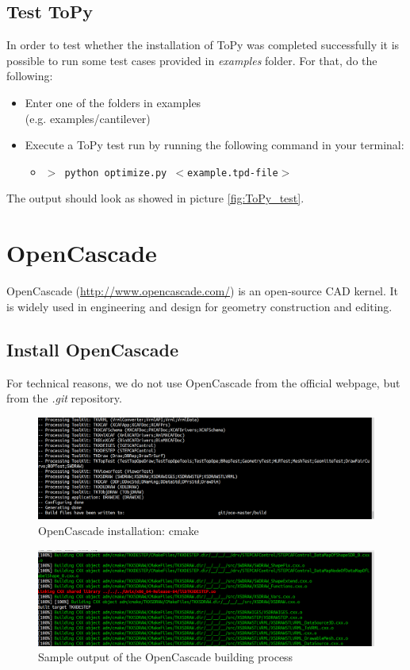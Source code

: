 \documentclass[
12pt, %
a4paper, %
oneside, %
headinclude,footinclude, %
BCOR5mm, %
]{scrartcl}
\begin{document}
\subsection{Test ToPy}
	In order to test whether the installation of ToPy was completed successfully it is possible to run some test cases provided in \textit{examples} folder. For that, do the following:
\begin{itemize}
	\item Enter one of the folders in examples \\(e.g. examples/cantilever)
	\item Execute a ToPy test run by running the following command in your terminal:
\begin{itemize}
	\item[] \texttt{\textbf{$>$ }python optimize.py $<$example.tpd-file$>$}
\end{itemize}
\end{itemize}
%
The output should look as showed in picture \ref{fig:ToPy_test}.

\section{OpenCascade}
\label{OpenCascade}
OpenCascade (\href{http://www.opencascade.com/}{http://www.opencascade.com/}) is an open-source CAD kernel. It is widely used in engineering and design for geometry construction and editing.
\subsection{Install OpenCascade}
For technical reasons, we do not use OpenCascade from the official webpage, but from the \textit{.git} repository. 
\begin{figure}
\centering
\includegraphics[scale=0.3]{img/OC_CMake2_cropped.png}
\caption{OpenCascade installation: cmake}
\label{fig:OC_cmake}
\end{figure}

\begin{figure}
\centering
\includegraphics[scale=0.3]{img/OC_Build5_cut.png}
\caption{Sample output of the OpenCascade building process}
\label{fig:OC_build}
\end{figure}
\end{document}
